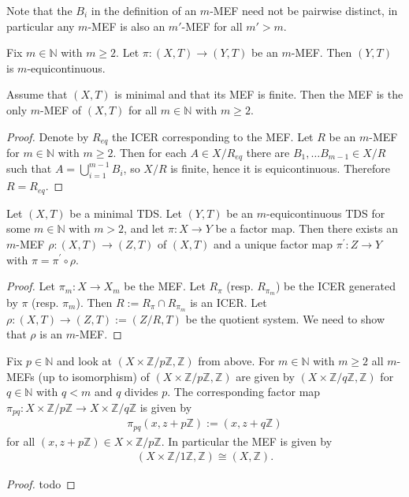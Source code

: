 \begin{remark}
	Note that the $B_i$ in the definition of an $m$-MEF need not be pairwise distinct, in particular any $m$-MEF is also an $m'$-MEF for all $m' > m$.
\end{remark}

\begin{proposition}
	Fix $m \in \mathbb{N}$ with $m \geq 2$. Let $\pi : (X,T) \to (Y, T)$ be an $m$-MEF. Then $(Y, T)$ is $m$-equicontinuous.
\end{proposition}

\begin{proposition}
	Assume that $(X, T)$ is minimal and that its MEF is finite. Then the MEF is the only $m$-MEF of $(X, T)$ for all $m \in \mathbb{N}$ with $m \geq 2$.
\end{proposition}
\begin{proof}
	Denote by $R_{eq}$ the ICER corresponding to the MEF. Let $R$ be an $m$-MEF for $m \in \mathbb{N}$ with $m \geq 2$. Then for each $A \in X/R_{eq}$ there are $B_1, \dots B_{m-1} \in X/R$ such that $A = \bigcup_{i=1}^{m-1} B_i$, so $X/R$ is finite, hence it is equicontinuous. Therefore $R = R_{eq}$.
\end{proof}

\begin{theorem}
	Let $(X, T)$ be a minimal TDS.
	Let $(Y, T)$ be an $m$-equicontinuous TDS for some $m \in \mathbb{N}$ with $m > 2$, and let $\pi: X \to Y$ be a factor map.
	Then there exists an $m$-MEF $\rho: (X,T) \to (Z,T)$ of $(X, T)$ and a unique factor map $\pi^\prime: Z \to Y$ with $\pi = \pi^\prime \circ \rho$.
\end{theorem}
\begin{proof}
	Let $\pi_m : X \to X_m$ be the MEF.
	Let $R_\pi$ (resp. $R_{\pi_m}$) be the ICER generated by $\pi$ (resp. $\pi_m$).
	Then $R:= R_\pi \cap R_{\pi_m}$ is an ICER.
	Let $\rho : (X,T) \to (Z,T):= (Z/R,T)$ be the quotient system.
	We need to show that $\rho$ is an $m$-MEF.
\end{proof}

\begin{example}
	Fix $p \in \mathbb{N}$ and look at $(X \times \mathbb{Z}/p\mathbb{Z}, \mathbb{Z})$ from above. For $m \in \mathbb{N}$ with $m \geq 2$ all $m$-MEFs (up to isomorphism) of $(X \times \mathbb{Z}/p\mathbb{Z}, \mathbb{Z})$ are given by $(X \times \mathbb{Z}/q\mathbb{Z}, \mathbb{Z})$ for $q \in \mathbb{N}$ with $q < m$ and $q$ divides $p$. The corresponding factor map $\pi_{pq}: X \times \mathbb{Z}/p\mathbb{Z} \to X \times \mathbb{Z}/q\mathbb{Z}$ is given by
	\begin{align*}
		\pi_{pq}(x, z + p\mathbb{Z}) := (x, z + q\mathbb{Z})
	\end{align*}
	for all $(x, z + p\mathbb{Z}) \in X \times \mathbb{Z}/p\mathbb{Z}$. In particular the MEF is given by
	\begin{align*}
		(X \times \mathbb{Z}/1\mathbb{Z}, \mathbb{Z}) \cong (X, \mathbb{Z}).
	\end{align*}
\end{example}
\begin{proof}
	todo
\end{proof}
